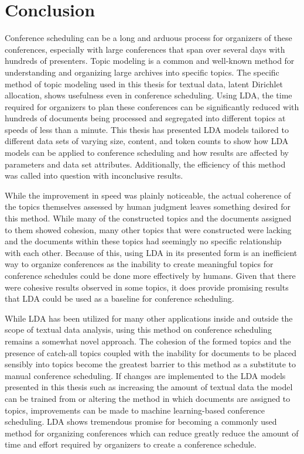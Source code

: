 \documentclass[a4paper, 12pt, twoside]{article}
\numberwithin{equation}{section} %
\begin{document}
\section{Conclusion}

Conference scheduling can be a long and arduous process for organizers of these conferences, especially with large conferences that span over several days with hundreds of presenters. Topic modeling is a common and well-known method for understanding and organizing large archives into specific topics. The specific method of topic modeling used in this thesis for textual data, latent Dirichlet allocation, shows usefulness even in conference scheduling. Using LDA, the time required for organizers to plan these conferences can be significantly reduced with hundreds of documents being processed and segregated into different topics at speeds of less than a minute. This thesis has presented LDA models tailored to different data sets of varying size, content, and token counts to show how LDA models can be applied to conference scheduling and how results are affected by parameters and data set attributes. Additionally, the efficiency of this method was called into question with inconclusive results. 

While the improvement in speed was plainly noticeable, the actual coherence of the topics themselves assessed by human judgment leaves something desired for this method. While many of the constructed topics and the documents assigned to them showed cohesion, many other topics that were constructed were lacking and the documents within these topics had seemingly no specific relationship with each other. Because of this, using LDA in its presented form is an inefficient way to organize conferences as the inability to create meaningful topics for conference schedules could be done more effectively by humans. Given that there were cohesive results observed in some topics, it does provide promising results that LDA could be used as a baseline for conference scheduling.

While LDA has been utilized for many other applications inside and outside the scope of textual data analysis, using this method on conference scheduling remains a somewhat novel approach. The cohesion of the formed topics and the presence of catch-all topics coupled with the inability for documents to be placed sensibly into topics become the greatest barrier to this method as a substitute to manual conference scheduling. If changes are implemented to the LDA models presented in this thesis such as increasing the amount of textual data the model can be trained from or altering the method in which documents are assigned to topics, improvements can be made to machine learning-based conference scheduling. LDA shows tremendous promise for becoming a commonly used method for organizing conferences which can reduce greatly reduce the amount of time and effort required by organizers to create a conference schedule.
\end{document}
